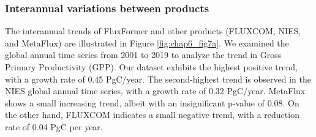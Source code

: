 \subsubsection{Interannual variations between products}

The interannual trends of FluxFormer and other products (FLUXCOM, NIES, and MetaFlux) are illustrated in Figure \ref{fig:chap6_fig7a}. We examined the global annual time series from 2001 to 2019 to analyze the trend in Gross Primary Productivity (GPP). Our dataset exhibits the highest positive trend, with a growth rate of 0.45 PgC/year. The second-highest trend is observed in the NIES global annual time series, with a growth rate of 0.32 PgC/year. MetaFlux shows a small increasing trend, albeit with an insignificant p-value of 0.08. On the other hand, FLUXCOM indicates a small negative trend, with a reduction rate of 0.04 PgC per year.\par

